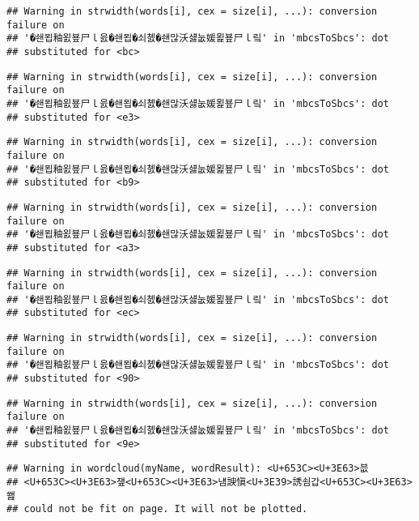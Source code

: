 \documentclass[]{article}
\begin{document}
\begin{verbatim}
## Warning in strwidth(words[i], cex = size[i], ...): conversion failure on
## '�쇈묍釉욄뵾尸ｌ읈�쇈묍�쇠쳸�쇈많沃섏눖媛묉뵾尸ｌ맄' in 'mbcsToSbcs': dot
## substituted for <bc>
\end{verbatim}

\begin{verbatim}
## Warning in strwidth(words[i], cex = size[i], ...): conversion failure on
## '�쇈묍釉욄뵾尸ｌ읈�쇈묍�쇠쳸�쇈많沃섏눖媛묉뵾尸ｌ맄' in 'mbcsToSbcs': dot
## substituted for <e3>
\end{verbatim}

\begin{verbatim}
## Warning in strwidth(words[i], cex = size[i], ...): conversion failure on
## '�쇈묍釉욄뵾尸ｌ읈�쇈묍�쇠쳸�쇈많沃섏눖媛묉뵾尸ｌ맄' in 'mbcsToSbcs': dot
## substituted for <b9>
\end{verbatim}

\begin{verbatim}
## Warning in strwidth(words[i], cex = size[i], ...): conversion failure on
## '�쇈묍釉욄뵾尸ｌ읈�쇈묍�쇠쳸�쇈많沃섏눖媛묉뵾尸ｌ맄' in 'mbcsToSbcs': dot
## substituted for <a3>
\end{verbatim}

\begin{verbatim}
## Warning in strwidth(words[i], cex = size[i], ...): conversion failure on
## '�쇈묍釉욄뵾尸ｌ읈�쇈묍�쇠쳸�쇈많沃섏눖媛묉뵾尸ｌ맄' in 'mbcsToSbcs': dot
## substituted for <ec>
\end{verbatim}

\begin{verbatim}
## Warning in strwidth(words[i], cex = size[i], ...): conversion failure on
## '�쇈묍釉욄뵾尸ｌ읈�쇈묍�쇠쳸�쇈많沃섏눖媛묉뵾尸ｌ맄' in 'mbcsToSbcs': dot
## substituted for <90>
\end{verbatim}

\begin{verbatim}
## Warning in strwidth(words[i], cex = size[i], ...): conversion failure on
## '�쇈묍釉욄뵾尸ｌ읈�쇈묍�쇠쳸�쇈많沃섏눖媛묉뵾尸ｌ맄' in 'mbcsToSbcs': dot
## substituted for <9e>
\end{verbatim}

\begin{verbatim}
## Warning in wordcloud(myName, wordResult): <U+653C><U+3E63>븞
## <U+653C><U+3E63>쟾<U+653C><U+3E63>냼諛愼<U+3E39>誘쇰갑<U+653C><U+3E63>쐞
## could not be fit on page. It will not be plotted.
\end{verbatim}
\end{document}
